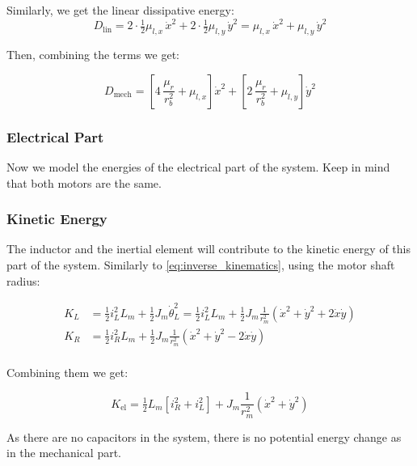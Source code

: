 Similarly, we get the linear dissipative energy:
\begin{equation*}
D_{\mathrm{lin}} = 2\cdot\tfrac{1}{2}\mu_{l,x}\,\dot x^2 + 2\cdot\tfrac{1}{2}\mu_{l,y}\,\dot y^2 = \mu_{l,x}\,\dot x^2 + \mu_{l,y}\,\dot y^2
\end{equation*}

Then, combining the terms we get:

\begin{equation}
\label{eq:dissipation_mech}
D_{\mathrm{mech}} = \left[4\,\frac{\mu_r}{r_b^2} + \mu_{l,x}\right]\dot x^2
    + \left[2\,\frac{\mu_r}{r_b^2} + \mu_{l,y}\right]\dot y^2
\end{equation}

\subsubsection{Electrical Part}
Now we model the energies of the electrical part of the system. Keep in mind that both motors are the same.

\subsubsection*{Kinetic Energy}
The inductor and the inertial element will contribute to the kinetic energy of this part of the system. Similarly to \eqref{eq:inverse_kinematics}, using the motor shaft radius:

\begin{equation*}
\begin{aligned}
K_L &= \tfrac{1}{2} i_L^2 L_m + \tfrac{1}{2} J_m \dot\theta_L^2 = \tfrac{1}{2} i_L^2 L_m + \tfrac{1}{2} J_m \frac{1}{r_m^2}\left(\dot x^2 + \dot y^2 + 2\dot x\dot y\right) \\
K_R &= \tfrac{1}{2} i_R^2 L_m + \tfrac{1}{2} J_m \frac{1}{r_m^2}\left(\dot x^2 + \dot y^2 - 2\dot x\dot y\right) \\
\end{aligned}
\end{equation*}

Combining them we get:

\begin{equation}
  \label{eq:kin_el}
  K_{\mathrm{el}} = \tfrac{1}{2} L_m \left[i_R^2 + i_L^2\right] + J_m \frac{1}{r_m^2}\left(\dot x^2 + \dot y^2\right)
\end{equation}

As there are no capacitors in the system, there is no potential energy change as in the mechanical part.

